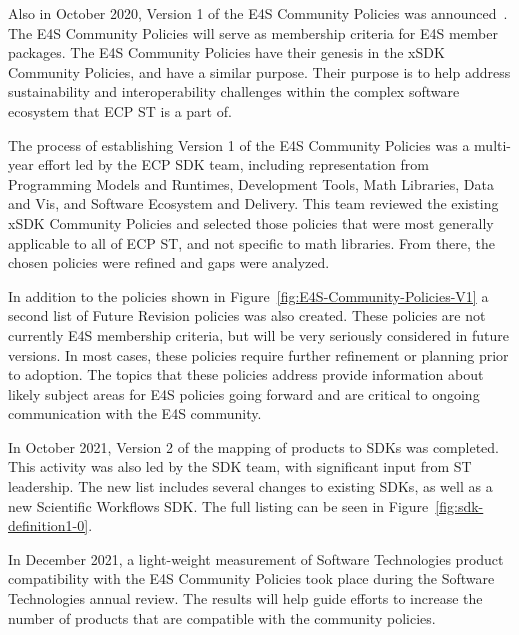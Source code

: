 Also in October 2020, Version 1 of the E4S Community Policies was announced~\cite{e4s:policies}. The E4S Community Policies will serve as membership criteria for E4S member packages. The E4S Community Policies have their genesis in the xSDK Community Policies, and have a similar purpose. Their purpose is to help address sustainability and interoperability challenges within the complex software ecosystem that ECP ST is a part of.

The process of establishing Version 1 of the E4S Community Policies was a multi-year effort led by the ECP SDK team, including representation from Programming Models and Runtimes, Development Tools, Math Libraries, Data and Vis, and Software Ecosystem and Delivery. This team reviewed the existing xSDK Community Policies and selected those policies that were most generally applicable to all of ECP ST, and not specific to math libraries. From there, the chosen policies were refined and gaps were analyzed.

In addition to the policies shown in Figure~\ref{fig:E4S-Community-Policies-V1} a second list of Future Revision policies was also created. These policies are not currently E4S membership criteria, but will be very seriously considered in future versions. In most cases, these policies require further refinement or planning prior to adoption. The topics that these policies address provide information about likely subject areas for E4S policies going forward and are critical to ongoing communication with the E4S community.

In October 2021, Version 2 of the mapping of products to SDKs was completed. This activity was also led by the SDK team, with significant input from ST leadership. The new list includes several changes to existing SDKs, as well as a new Scientific Workflows SDK. The full listing can be seen in Figure~\ref{fig:sdk-definition1-0}.

In December 2021, a light-weight measurement of Software Technologies product compatibility with the E4S Community Policies took place during the Software Technologies annual review. The results will help guide efforts to increase the number of products that are compatible with the community policies.



